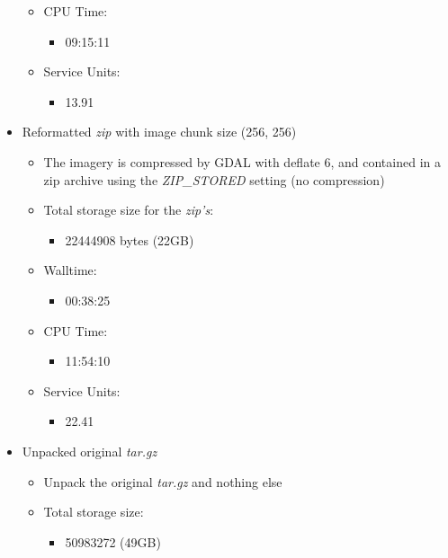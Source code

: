 \documentclass[a4paper]{article}
\begin{document}
\begin{itemize}
\begin{itemize}
\begin{itemize}
          \end{itemize}
        \item CPU Time:
          \begin{itemize}
            \item 09:15:11
          \end{itemize}
        \item Service Units:
          \begin{itemize}
            \item 13.91
          \end{itemize}
      \end{itemize}
      \item Reformatted \textit{zip} with image chunk size (256, 256)
      \begin{itemize}
        \item The imagery is compressed by GDAL with deflate 6, and contained in a zip archive using the \textit{ZIP\_STORED} setting (no compression)
        \item Total storage size for the \textit{zip’s}:
          \begin{itemize}
            \item 22444908 bytes (22GB)
          \end{itemize}
        \item Walltime:
          \begin{itemize}
            \item 00:38:25
          \end{itemize}
        \item CPU Time:
          \begin{itemize}
            \item 11:54:10
          \end{itemize}
        \item Service Units:
          \begin{itemize}
            \item 22.41
          \end{itemize}
      \end{itemize}
      \item Unpacked original \textit{tar.gz}
      \begin{itemize}
        \item Unpack the original \textit{tar.gz} and nothing else
        \item Total storage size:
          \begin{itemize}
            \item 50983272 (49GB)

\end{itemize}
\end{itemize}
\end{itemize}
\end{document}
